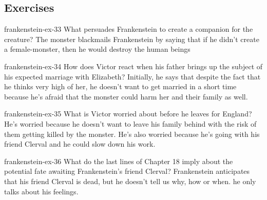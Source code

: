 \documentclass[preview]{standalone}
\begin{document}
\genpage

\subsection{Exercises}

\begin{snippetexercise}{frankenstein-ex-33}
    {What persuades Frankenstein to create a companion for the creature?}
    The monster blackmails Frankenstein by saying that if he didn't create a female-monster,
    then he would destroy the human beings 
\end{snippetexercise}

\begin{snippetexercise}{frankenstein-ex-34}
    {How does Victor react when his father brings up the subject of his expected marriage with
    Elizabeth?}
    Initially, he says that despite the fact that he thinks very high of her, he doesn't want
    to get married in a short time because he's afraid that the monster could 
    harm her and their family as well.
\end{snippetexercise}

\begin{snippetexercise}{frankenstein-ex-35}
    {What is Victor worried about before he leaves for England?}
    He's worried because he doesn't want to leave his family behind
    with the risk of them getting killed by the monster.
    He's also worried because he's going with his friend Clerval and he could 
    slow down his work.
\end{snippetexercise}

\begin{snippetexercise}{frankenstein-ex-36}
    {What do the last lines of Chapter 18 imply about the potential fate awaiting Frankenstein's friend
    Clerval?}
    Frankenstein anticipates that his friend Clerval is dead, but he doesn't tell us why,
    how or when. he only talks about his feelings. 
\end{snippetexercise}
\end{document}
